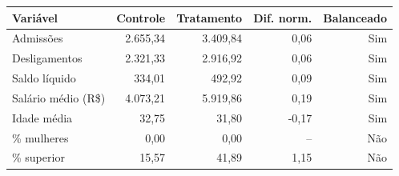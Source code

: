 \scriptsize
\begin{tabular}{lrrrr}
\toprule
Variável & Controle & Tratamento & Dif. norm. & Balanceado \\
\midrule
Admissões & 2.655,34 & 3.409,84 & 0,06 & Sim \\
Desligamentos & 2.321,33 & 2.916,92 & 0,06 & Sim \\
Saldo líquido & 334,01 & 492,92 & 0,09 & Sim \\
Salário médio (R\$) & 4.073,21 & 5.919,86 & 0,19 & Sim \\
Idade média & 32,75 & 31,80 & -0,17 & Sim \\
\% mulheres & 0,00 & 0,00 & -- & Não \\
\% superior & 15,57 & 41,89 & 1,15 & Não \\
\bottomrule
\end{tabular}
